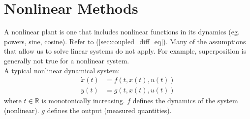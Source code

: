\documentclass[../notes.tex]{subfiles}
\begin{document}
\section{Nonlinear Methods}
A nonlinear plant is one that includes nonlinear functions in its dynamics (eg. powers, sine, cosine). Refer to (\underline{\ref{sec:coupled_diff_eq}}). Many of the assumptions that allow us to solve linear systems do not apply. For example, superposition is generally not true for a nonlinear system. \\
A typical nonlinear dynamical system:
\begin{align*}
    \dot{x}(t) &= f(t, x(t), u(t)) \\
    y(t) &= g(t, x(t), u(t))
\end{align*}
where $t \in \mathbb{R}$ is monotonically increasing. $f$ defines the dynamics of the system (nonlinear). $g$ defines the output (measured quantities).
\end{document}
